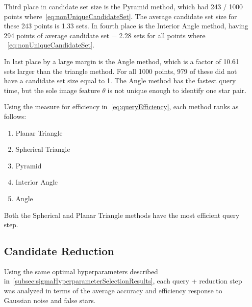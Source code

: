 Third place in candidate set size is the Pyramid method, which had 243 / 1000 points
where~\autoref{eq:nonUniqueCandidateSet}.
The average candidate set size for these 243 points is 1.33 sets.
In fourth place is the Interior Angle method, having 294 points of average candidate set = 2.28 sets for all points where
~\autoref{eq:nonUniqueCandidateSet}.

In last place by a large margin is the Angle method, which is a factor of 10.61 sets larger than the triangle method.
For all 1000 points, 979 of these did not have a candidate set size equal to 1.
The Angle method has the fastest query time, but the sole image feature $\theta$ is not unique enough to identify one
star pair.

Using the measure for efficiency in~\autoref{eq:queryEfficiency}, each method ranks as follows:
\begin{multicols}{2}
    \begin{enumerate}
        \item Planar Triangle
        \item Spherical Triangle
        \item Pyramid
        \item Interior Angle
        \item Angle
    \end{enumerate}
\end{multicols}

Both the Spherical and Planar Triangle methods have the most efficient query step.

\subsection{Candidate Reduction}\label{subsec:candidateReductionResults}
Using the same optimal hyperparameters described in~\autoref{subsec:sigmaHyperparameterSelectionResults}, each query +
reduction step was analyzed in terms of the average accuracy and efficiency response to Gaussian noise and false stars.

\begin{figure}
\end{figure}

